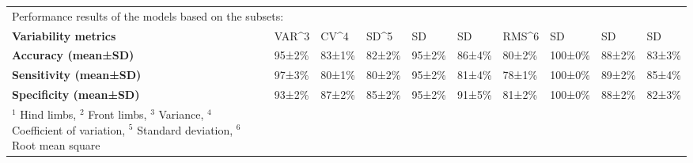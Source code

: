 \begin{sidewaystable}[!htbp]
{\begin{tabular}{p{4.5cm}p{1cm}p{1cm}p{1cm}p{1cm}p{1cm}p{1cm}p{1cm}p{1cm}p{1cm}}
\hline
\multicolumn{10}{l}{{Performance results of the models based on the subsets:}}\\[0.2 em]
\bf Variability metrics & VAR^3 & CV^4 & SD^5 & SD & SD & RMS^6 & SD & SD & SD\\[0.2 em]
\bf Accuracy (mean±SD) & 95±2\% & 83±1\% & 82±2\% & 95±2\% & 86±4\% & 80±2\% & 100±0\% & 88±2\% & 83±3\%\\ [0.2 em]
\bf Sensitivity (mean±SD) & 97±3\% & 80±1\% & 80±2\% & 95±2\% & 81±4\% & 78±1\% & 100±0\% & 89±2\% & 85±4\%\\ [0.2 em]
\bf Specificity (mean±SD) & 93±2\% & 87±2\% & 85±2\% & 95±2\% & 91±5\% & 81±2\% & 100±0\% & 88±2\% & 82±3\%\\ [0.1 em]

 \bottomrule
 \footnotesize{$^1$ Hind limbs,  $^2$ Front limbs,  $^3$ Variance,  $^4$ Coefficient of variation,  $^5$ Standard deviation,  $^6$ Root mean square}\\
  \end{tabular}}
    \label{featuresss results}

    \end{sidewaystable}
